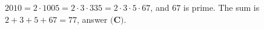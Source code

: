 $2010=2\cdot1005=2\cdot3\cdot335=2\cdot3\cdot5\cdot67$, and $67$ is prime. The sum is $2+3+5+67=\boxed{77}$, answer $\textbf{(C)}$.
